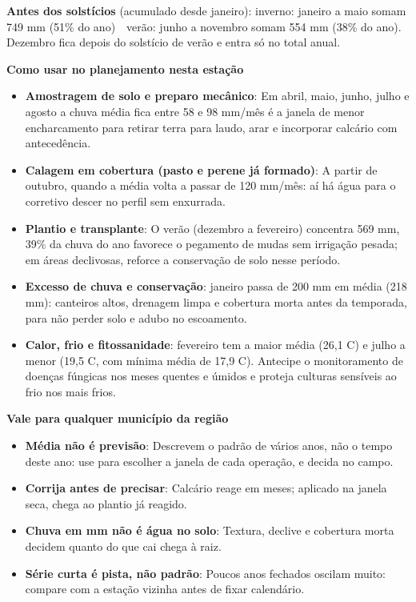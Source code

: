 \documentclass[10pt,a4paper]{article}
\begin{document}
\vspace{1pt}
{\footnotesize\textbf{Antes dos solstícios} (acumulado desde janeiro):
inverno: janeiro a maio somam 749 mm (51\% do ano) \,\textbullet\, verão: junho a novembro somam 554 mm (38\% do ano). Dezembro fica depois do solstício de verão e entra só no total
anual.}

\vspace{2pt}
{\bfseries\small Como usar no planejamento nesta estação}

\footnotesize\begin{itemize}\setlength{\itemsep}{0.5pt}
  \item \textbf{Amostragem de solo e preparo mecânico}: Em abril, maio, junho, julho e agosto a chuva média fica entre 58 e 98 mm/mês \textemdash{} é a janela de menor encharcamento para retirar terra para laudo, arar e incorporar calcário com antecedência.
  \item \textbf{Calagem em cobertura (pasto e perene já formado)}: A partir de outubro, quando a média volta a passar de 120 mm/mês: aí há água para o corretivo descer no perfil sem enxurrada.
  \item \textbf{Plantio e transplante}: O verão (dezembro a fevereiro) concentra 569 mm, 39\% da chuva do ano \textemdash{} favorece o pegamento de mudas sem irrigação pesada; em áreas declivosas, reforce a conservação de solo nesse período.
  \item \textbf{Excesso de chuva e conservação}: janeiro passa de 200 mm em média (218 mm): canteiros altos, drenagem limpa e cobertura morta antes da temporada, para não perder solo e adubo no escoamento.
  \item \textbf{Calor, frio e fitossanidade}: fevereiro tem a maior média (26,1 \textdegree{}C) e julho a menor (19,5 \textdegree{}C, com mínima média de 17,9 \textdegree{}C). Antecipe o monitoramento de doenças fúngicas nos meses quentes e úmidos e proteja culturas sensíveis ao frio nos mais frios.
\end{itemize}

\vspace{1pt}
{\bfseries\small Vale para qualquer município da região}

\scriptsize\begin{itemize}\setlength{\itemsep}{0.5pt}
  \item \textbf{Média não é previsão}: Descrevem o padrão de vários anos, não o tempo deste ano: use para escolher a janela de cada operação, e decida no campo.
  \item \textbf{Corrija antes de precisar}: Calcário reage em meses; aplicado na janela seca, chega ao plantio já reagido.
  \item \textbf{Chuva em mm não é água no solo}: Textura, declive e cobertura morta decidem quanto do que cai chega à raiz.
  \item \textbf{Série curta é pista, não padrão}: Poucos anos fechados oscilam muito: compare com a estação vizinha antes de fixar calendário.
\end{itemize}
\end{document}
